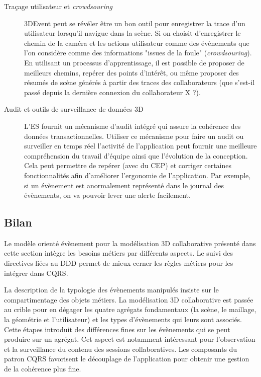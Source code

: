 \begin{description}
	\item[Traçage utilisateur et \textit{crowdsouring}] 3DEvent peut se révéler être 
	un bon outil pour enregistrer la trace d'un utilisateur lorsqu'il navigue dans la 
	scène. Si on choisit d'enregistrer le chemin de la caméra et les actions 
	utilisateur comme des évènements que l'on considère comme des informations 
	"issues de la foule" (\textit{crowdsouring}). En utilisant un processus 
	d'apprentissage, il est possible de proposer de meilleurs chemins, repérer des 
	points d'intérêt, ou même proposer des résumés de scène générés à partir des 
	traces des collaborateurs (que s'est-il passé depuis la dernière connexion du 
	collaborateur X ?).
	\item[Audit et outils de surveillance de données 3D] L'\gls{ES} fournit un 
	mécanisme 
	d'audit intégré qui assure la cohérence des données transactionnelles. Utiliser 
	ce mécanisme pour faire un audit ou surveiller en temps réel l'activité de 
	l'application peut fournir une meilleure compréhension du travail d'équipe ainsi 
	que l'évolution de la conception. Cela peut permettre de repérer (avec du 
	\gls{CEP}) et corriger certaines fonctionnalités afin d'améliorer l'ergonomie de 
	l'application. Par exemple, si un évènement est anormalement représenté dans 
	le journal des évènements, on va pouvoir lever une alerte facilement.
\end{description}
\subsection{Bilan}

Le modèle orienté évènement pour la modélisation 3D collaborative présenté dans 
cette section intègre les besoins métiers par différents aspects. Le suivi des 
directives liées au \gls{DDD} permet de mieux cerner les règles 
métiers pour les intégrer dans \gls{CQRS}. 

La description de la typologie des 
évènements manipulés insiste sur le compartimentage des objets métiers. La 
modélisation 3D collaborative est passée au crible pour en dégager les quatre 
agrégats fondamentaux (la scène, le maillage, la géométrie et l'utilisateur) et les 
types d'évènements qui leurs sont associés. Cette étapes introduit des différences 
fines sur les évènements qui se peut produire sur un agrégat. 
Cet aspect est notamment intéressant pour l'observation et la surveillance du 
contenu des sessions collaboratives.
Les composants du patron \gls{CQRS} favorisent le découplage de l'application 
pour obtenir une gestion de la cohérence plus fine. 

